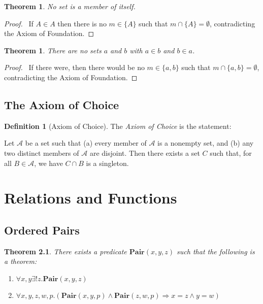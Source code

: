\documentclass{report}
\let\qed\relax
\newtheorem{theorem}[axiom]{Theorem}
\theoremstyle{definition}
\newtheorem{definition}[axiom]{Definition}
\begin{document}
    \begin{theorem}
        No set is a member of itself.
    \end{theorem}

    \begin{proof}
        \pf\ If $A \in A$ then there is no $m \in \{A\}$ such that $m \cap \{A\} = \emptyset$,
        contradicting the Axiom of Foundation. \qed
    \end{proof}

    \begin{theorem}
        There are no sets $a$ and $b$ with $a \in b$ and $b \in a$.
    \end{theorem}

    \begin{proof}
        \pf\ If there were, then there would be no $m \in \{ a,b \}$ such that  $m \cap \{ a,b \} = \emptyset$,
        contradicting the Axiom of Foundation. \qed
    \end{proof}

    \section{The Axiom of Choice}

    \begin{definition}[Axiom of Choice]
        The \emph{Axiom of Choice} is the statement:

        Let $\mathcal{A}$ be a set such that (a) every member of $\mathcal{A}$ is a nonempty set,
        and (b) any two distinct members of $\mathcal{A}$ are disjoint. Then there exists a set $C$
        such that, for all $B \in \mathcal{A}$, we have $C \cap B$ is a singleton.
    \end{definition}

    \chapter{Relations and Functions}

    \section{Ordered Pairs}

    \begin{theorem}
        There exists a predicate $\mathbf{Pair}(x,y,z)$ such that the following is a theorem:
        \begin{enumerate}
            \item $\forall x,y \exists ! z. \mathbf{Pair}(x,y,z)$
            \item $\forall x,y,z,w,p. (\mathbf{Pair}(x,y,p) \wedge \mathbf{Pair}(z,w,p) \Rightarrow x = z \wedge y = w)$
        \end{enumerate}
    \end{theorem}
\end{document}
